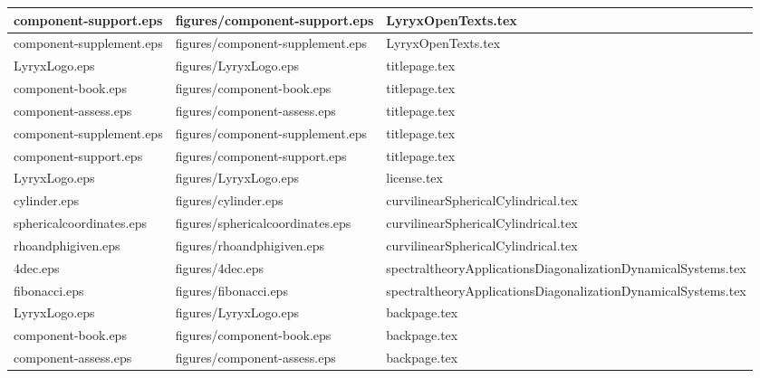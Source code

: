 \documentclass[11pt]{article}
\begin{document}
\begin{longtable}{|p{4cm}|p{4cm}|p{5cm}|}
component-support.eps & figures/component-support.eps & LyryxOpenTexts.tex \\
\hline

component-supplement.eps & figures/component-supplement.eps & LyryxOpenTexts.tex \\
\hline

LyryxLogo.eps & figures/LyryxLogo.eps & titlepage.tex \\
\hline

component-book.eps & figures/component-book.eps & titlepage.tex \\
\hline

component-assess.eps & figures/component-assess.eps & titlepage.tex \\
\hline

component-supplement.eps & figures/component-supplement.eps & titlepage.tex \\
\hline

component-support.eps & figures/component-support.eps & titlepage.tex \\
\hline

LyryxLogo.eps & figures/LyryxLogo.eps & license.tex \\
\hline

cylinder.eps & figures/cylinder.eps & curvilinearSphericalCylindrical.tex \\
\hline

sphericalcoordinates.eps & figures/sphericalcoordinates.eps & curvilinearSphericalCylindrical.tex \\
\hline

rhoandphigiven.eps & figures/rhoandphigiven.eps & curvilinearSphericalCylindrical.tex \\
\hline

4dec.eps & figures/4dec.eps & spectraltheoryApplicationsDiagonalizationDynamicalSystems.tex \\
\hline

fibonacci.eps & figures/fibonacci.eps & spectraltheoryApplicationsDiagonalizationDynamicalSystems.tex \\
\hline

LyryxLogo.eps & figures/LyryxLogo.eps & backpage.tex \\
\hline

component-book.eps & figures/component-book.eps & backpage.tex \\
\hline

component-assess.eps & figures/component-assess.eps & backpage.tex \\
\hline


\end{longtable}
\end{document}
